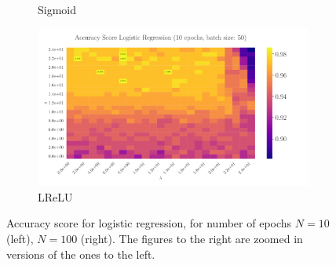 \documentclass[%
reprint,
amsmath,amssymb,
aps,
]{revtex4-2}
\begin{document}
\begin{figure}
\begin{subfigure}{0.4353\textwidth}
		\caption{Sigmoid}
		\label{fig:LogReg25x25_epoch100_bacthS50}
	\end{subfigure}
	\hfill
	\begin{subfigure}{0.4353\textwidth}
		\includegraphics[width=\textwidth]{Python/Figures/LogReg25x25_epoch10_batchS50_zoomed.pdf}
		\caption{LReLU}
		\label{fig:LogReg25x25_epoch100_bacthS50_zoomed}
	\end{subfigure}
	\caption{Accuracy score for logistic regression, for number of epochs \(N=10\) (left), \(N=100\) (right). The figures to the right are zoomed in versions of the ones to the left.}
	\label{fig:LogReg}
\end{figure}
\end{document}
